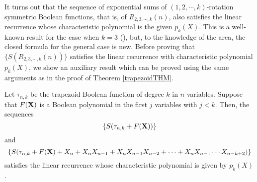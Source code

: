 It turns out that the sequence of exponential sums of $(1,2,\cdots,k)$-rotation symmetric Boolean functions, that is, of $R_{2,3,\cdots, k}(n)$, also satisfies the linear recurrence whose characteristic 
polynomial is the given $p_k(X)$. This is a well-known result for the case when $k=3$ (\cite{BCP,browncusick, cusickjohns}), but, to the knowledge of the area, the closed formula for the general case is new. 
Before proving that $\{S(R_{2,3,\cdots, k}(n))\}$ satisfies the linear recurrence with characteristic polynomial $p_k(X)$, we show an auxiliary result which can be proved using the same arguments as in the 
proof of Theorem \ref{trapezoidTHM}.

\begin{lemma}
\label{trapezoidplusLemma}
 Let $\tau_{n,k}$ be the trapezoid Boolean function of degree $k$ in $n$ variables.  Suppose that $F({\bf X})$ is a Boolean polynomial in the first $j$ variables with $j<k$.  Then, the sequences
 $$\{S(\tau_{n,k}+F({\bf X}))\}$$ and $$\{S(\tau_{n,k}+F({\bf X})+X_n+X_nX_{n-1}+X_nX_{n-1}X_{n-2}+\cdots+X_nX_{n-1}\cdots X_{n-k+2})\}$$ satisfies the linear recurrence whose characteristic polynomial 
 is given by $p_k(X)$.
\end{lemma}

